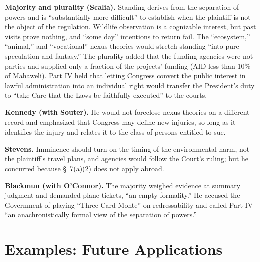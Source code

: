 \documentclass[12pt]{article}
\begin{document}
\textbf{Majority and plurality (Scalia).} Standing derives from the separation of powers and is ``substantially more difficult'' to establish when the plaintiff is not the object of the regulation. Wildlife observation is a cognizable interest, but past visits prove nothing, and ``some day'' intentions to return fail. The ``ecosystem,'' ``animal,'' and ``vocational'' nexus theories would stretch standing ``into pure speculation and fantasy.'' The plurality added that the funding agencies were not parties and supplied only a fraction of the projects' funding (AID less than 10\% of Mahaweli). Part IV held that letting Congress convert the public interest in lawful administration into an individual right would transfer the President's duty to ``take Care that the Laws be faithfully executed'' to the courts.

\textbf{Kennedy (with Souter).} He would not foreclose nexus theories on a different record and emphasized that Congress may define new injuries, so long as it identifies the injury and relates it to the class of persons entitled to sue.

\textbf{Stevens.} Imminence should turn on the timing of the environmental harm, not the plaintiff's travel plans, and agencies would follow the Court's ruling; but he concurred because \S~7(a)(2) does not apply abroad.

\textbf{Blackmun (with O'Connor).} The majority weighed evidence at summary judgment and demanded plane tickets, ``an empty formality.'' He accused the Government of playing ``Three-Card Monte'' on redressability and called Part IV ``an anachronistically formal view of the separation of powers.''

\section{Examples: Future Applications}
\end{document}
